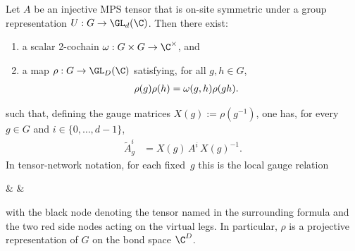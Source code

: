 \begin{theorem}%
    \label{thm:virtual_rep_injective}
    \leanok
    Let $A$ be an injective MPS tensor that is on-site symmetric
    under a group representation $U : G \to \GL_{d}(\C)$.
    Then there exist:
    \begin{enumerate}
        \item a scalar 2-cochain
              $\omega : G \times G \to \C^{\times}$, and
        \item a map $\rho : G \to \GL_{D}(\C)$ satisfying, for all $g,h \in G$,
              \begin{align}
                  \rho(g) \rho(h)
                   & =\omega(g,h) \rho(gh).
                  \notag
              \end{align}
    \end{enumerate}
    such that, defining the gauge matrices $X(g):=\rho(g^{-1})$,
    one has, for every $g \in G$ and $i \in \{0,\ldots,d{-}1\}$,
    \begin{align}
        \widetilde{A}_g^i
         & =X(g)\,A^i\,X(g)^{-1}.
        \label{eq:symmetry_virtual_gauge}
    \end{align}
    In tensor-network notation, for each fixed~$g$ this is the local gauge
    relation
    \begin{center}
        \tenkzkernel
        \begin{tenkz}[rows={wire}, cols=3, west=open, east=open]
             &  &
        \end{tenkz}
    \end{center}
    with the black node denoting the tensor named in the surrounding
    formula and the two red side nodes acting on the virtual legs.
    In particular, $\rho$ is a projective representation of $G$ on the
    bond space $\C^D$.
\end{theorem}

